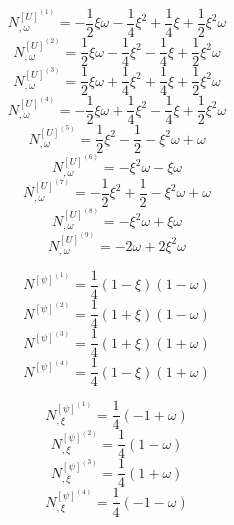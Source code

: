 \documentclass{article}
\begin{document}
\begin{equation}
N_{,\omega}^{[U]^{(1)}} = -\dfrac{1}{2}\xi\omega-\dfrac{1}{4}\xi^2+\dfrac{1}{4}\xi+\dfrac{1}{2}\xi^2\omega
\end{equation}
\begin{equation}
N_{,\omega}^{[U]^{(2)}} = \dfrac{1}{2}\xi\omega-\dfrac{1}{4}\xi^2-\dfrac{1}{4}\xi+\dfrac{1}{2}\xi^2\omega
\end{equation}
\begin{equation}
N_{,\omega}^{[U]^{(3)}} = \dfrac{1}{2}\xi\omega+\dfrac{1}{4}\xi^2+\dfrac{1}{4}\xi+\dfrac{1}{2}\xi^2\omega
\end{equation}
\begin{equation}
N_{,\omega}^{[U]^{(4)}} = -\dfrac{1}{2}\xi\omega+\dfrac{1}{4}\xi^2-\dfrac{1}{4}\xi+\dfrac{1}{2}\xi^2\omega
\end{equation}
\begin{equation}
N_{,\omega}^{[U]^{(5)}} = \dfrac{1}{2}\xi^2-\dfrac{1}{2}-\xi^2\omega+\omega
\end{equation}
\begin{equation}
N_{,\omega}^{[U]^{(6)}} = -\xi^2\omega-\xi\omega
\end{equation}
\begin{equation}
N_{,\omega}^{[U]^{(7)}} =  -\dfrac{1}{2}\xi^2+\dfrac{1}{2}-\xi^2\omega+\omega
\end{equation}
\begin{equation}
N_{,\omega}^{[U]^{(8)}} = -\xi^2\omega+\xi\omega
\end{equation}
\begin{equation}
N_{,\omega}^{[U]^{(9)}} = -2\omega+2\xi^2\omega
\end{equation}

\begin{equation}
N^{[\psi]^{(1)}} = \dfrac{1}{4}(1-\xi)(1-\omega) 
\end{equation}
\begin{equation}
N^{[\psi]^{(2)}} = \dfrac{1}{4}(1+\xi)(1-\omega) 
\end{equation}
\begin{equation}
N^{[\psi]^{(3)}} = \dfrac{1}{4}(1+\xi)(1+\omega) 
\end{equation}
\begin{equation}
N^{[\psi]^{(4)}} = \dfrac{1}{4}(1-\xi)(1+\omega) 
\end{equation}

\begin{equation}
N_{,\xi}^{[\psi]^{(1)}} = \dfrac{1}{4}(-1+\omega)
\end{equation}
\begin{equation}
N_{,\xi}^{[\psi]^{(2)}} = \dfrac{1}{4}(1-\omega)
\end{equation}
\begin{equation}
N_{,\xi}^{[\psi]^{(3)}} = \dfrac{1}{4}(1+\omega)
\end{equation}
\begin{equation}
N_{,\xi}^{[\psi]^{(4)}} = \dfrac{1}{4}(-1-\omega)
\end{equation}
\end{document}
